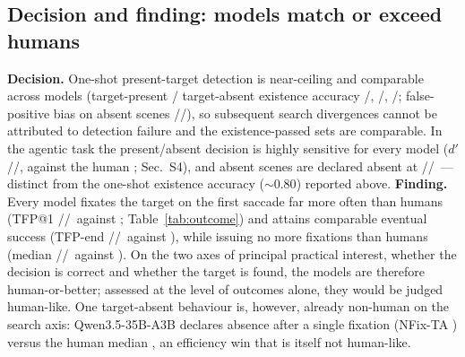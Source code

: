 \documentclass[runningheads]{llncs}
\begin{document}
\subsection{Decision and finding: models match or exceed humans}
\label{sec:dec}
 \vspace{-3mm}

\begin{table}[!tb]\centering
\caption{Outcome by foveation condition (existence-passed trials); each entry is Qwen/GLM/Gemma (Q/G/Gm) against the human reference (first row; per-model $n$ differs slightly). Finding and outcome measures match or exceed the human values; the \emph{dynamic} gaze divergence is quantified in Table~\ref{tab:gaze}, though target-absent search length (NFix-TA) also differs from humans for Qwen. TFP@$1$/TFP-end: target fixated on the first / by the final saccade (TP); NFix-TP/-TA: median fixations on target-present/absent trials; TA decl.-abs: target-absent declared-absent rate; dens.\ CC: correlation of model and human fixation-density maps.}
\label{tab:outcome}
\setlength{\tabcolsep}{4pt}
\resizebox{\linewidth}{!}{}
 \vspace{-2mm}
\end{table}
\textbf{Decision.} One-shot present-target detection is near-ceiling and comparable across models (target-present /
target-absent existence accuracy \QwenTPexist/\QwenTAexist, \GlmTPexist/\GlmTAexist,
\GemmaTPexist/\GemmaTAexist; false-positive bias on absent scenes
\QwenYesBias/\GlmYesBias/\GemmaYesBias), so subsequent search divergences cannot be attributed to
detection failure and the existence-passed sets are comparable. In the agentic task the present/absent
decision is highly sensitive for every model ($d'$ \QwenGPDprime/\GlmGPDprime/\GemmaGPDprime, against the
human \HumanDprime; Sec.~S4), and absent scenes are declared absent at \QwenGPDeclAbs/\GlmGPDeclAbs/\GemmaGPDeclAbs\ --- distinct from the one-shot existence accuracy ($\sim$$0.80$) reported above. \textbf{Finding.} Every model fixates the target on the
first saccade far more often than humans (TFP@1 \QwenGPTFPone/\GlmGPTFPone/\GemmaGPTFPone\ against
\HumanTFPone; Table~\ref{tab:outcome}) and attains comparable eventual success (TFP-end
\QwenGPTFPend/\GlmGPTFPend/\GemmaGPTFPend\ against \HumanTFPend), while issuing no more fixations than
humans (median \QwenGPNumFixTP/\GlmGPNumFixTP/\GemmaGPNumFixTP\ against \HumanNumFixTP). On the two axes
of principal practical interest, whether the decision is correct and whether the target is found, the
models are therefore human-or-better; assessed at the level of outcomes alone, they would be judged
human-like. One target-absent behaviour is, however, already non-human on the search axis: Qwen3.5-35B-A3B declares absence after a single fixation (NFix-TA \QwenGPNumFixTA) versus the human median \HumanNumFixTA, an efficiency win that is itself not human-like.
 
\end{document}
